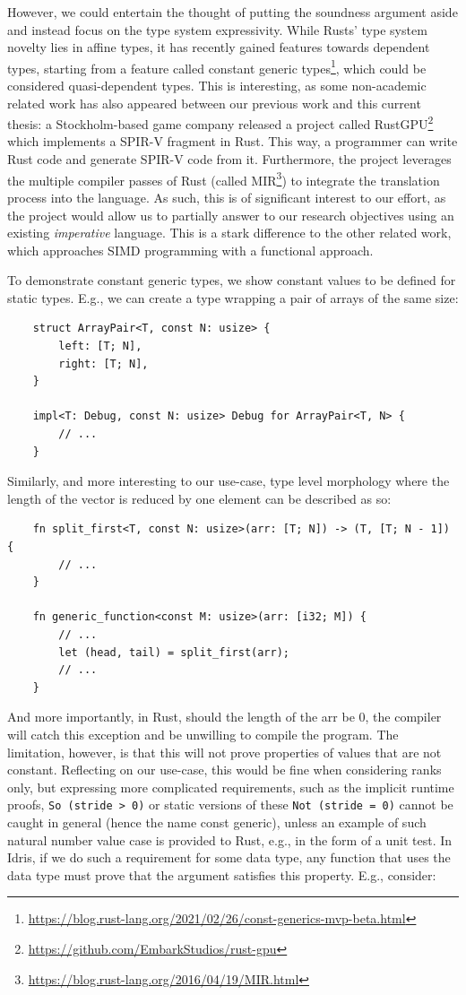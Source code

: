 \documentclass{report}
\begin{document}
However, we could entertain the thought of putting the soundness argument aside and instead focus on the type system expressivity. While Rusts' type system novelty lies in affine types, it has recently gained features towards dependent types, starting from a feature called constant generic types\footnote{\url{https://blog.rust-lang.org/2021/02/26/const-generics-mvp-beta.html}}, which could be considered quasi-dependent types. This is interesting, as some non-academic related work has also appeared between our previous work and this current thesis: a Stockholm-based game company released a project called RustGPU\footnote{\url{https://github.com/EmbarkStudios/rust-gpu}} which implements a SPIR-V fragment in Rust. This way, a programmer can write Rust code and generate SPIR-V code from it. Furthermore, the project leverages the multiple compiler passes of Rust (called MIR\footnote{\url{https://blog.rust-lang.org/2016/04/19/MIR.html}}) to integrate the translation process into the language. As such, this is of significant interest to our effort, as the project would allow us to partially answer to our research objectives using an existing \emph{imperative} language. This is a stark difference to the other related work, which approaches SIMD programming with a functional approach.

To demonstrate constant generic types, we show constant values to be defined for static types. E.g., we can create a type wrapping a pair of arrays of the same size:

\begin{verbatim}
    struct ArrayPair<T, const N: usize> {
        left: [T; N],
        right: [T; N],
    }

    impl<T: Debug, const N: usize> Debug for ArrayPair<T, N> {
        // ...
    }
\end{verbatim}

Similarly, and more interesting to our use-case, type level morphology where the length of the vector is reduced by one element can be described as so:

\begin{verbatim}
    fn split_first<T, const N: usize>(arr: [T; N]) -> (T, [T; N - 1]) {
        // ...
    }

    fn generic_function<const M: usize>(arr: [i32; M]) {
        // ...
        let (head, tail) = split_first(arr);
        // ...
    }
\end{verbatim}

And more importantly, in Rust, should the length of the arr be 0, the compiler will catch this exception and be unwilling to compile the program. The limitation, however, is that this will not prove properties of values that are not constant. Reflecting on our use-case, this would be fine when considering ranks only, but expressing more complicated requirements, such as the implicit runtime proofs, \verb|So (stride > 0)| or static versions of these \verb|Not (stride = 0)| cannot be caught in general (hence the name const generic), unless an example of such natural number value case is provided to Rust, e.g., in the form of a unit test. In Idris, if we do such a requirement for some data type, any function that uses the data type must prove that the argument satisfies this property. E.g., consider:
\end{document}
